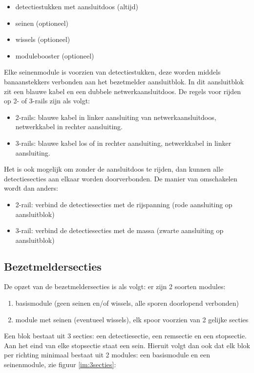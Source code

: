 \documentclass[12pt,a4paper]{report}
\begin{document}
\begin{itemize}
\item detectiestukken met aansluitdoos (altijd)
\item seinen (optioneel)
\item wissels (optioneel)
\item modulebooster (optioneel)
\end{itemize}

Elke seinenmodule is voorzien van detectiestukken, deze worden middels banaanstekkers verbonden aan het bezetmelder aansluitblok.  In dit aansluitblok zit een blauwe kabel en een dubbele netwerkaansluitdoos. De regels voor rijden op 2- of 3-rails zijn als volgt:

\begin{itemize}
\item 2-rails: blauwe kabel in linker aansluiting van netwerkaansluitdoos, netwerkkabel in rechter aansluiting.
\item 3-rails: blauwe kabel los of in rechter aansluiting, netwerkkabel in linker aansluiting.
\end{itemize}

Het is ook mogelijk om zonder de aansluitdoos te rijden, dan kunnen alle detectiesecties aan elkaar worden doorverbonden. De manier van omschakelen wordt dan anders:

\begin{itemize}
\item 2-rail: verbind de detectiesecties met de rijspanning (rode aansluiting op aansluitblok)
\item 3-rail: verbind de detectiesecties met de massa (zwarte aansluiting op aansluitblok)
\end{itemize}

\subsection{Bezetmeldersecties}
De opzet van de bezetmeldersecties is als volgt:
er zijn 2 soorten modules:

\begin{enumerate}
\item basismodule (geen seinen en/of wissels, alle sporen doorlopend verbonden)
\item module met seinen (eventueel wissels), elk spoor voorzien van 2 gelijke secties
\end{enumerate}

Een blok bestaat uit 3 secties: een detectiesectie, een remsectie en een stopsectie. Aan het eind van elke stopsectie staat een sein. Hieruit volgt dan ook dat elk blok per richting minimaal bestaat uit 2 modules: een basismodule en een seinenmodule, zie figuur \ref{im:3secties}:
\end{document}
